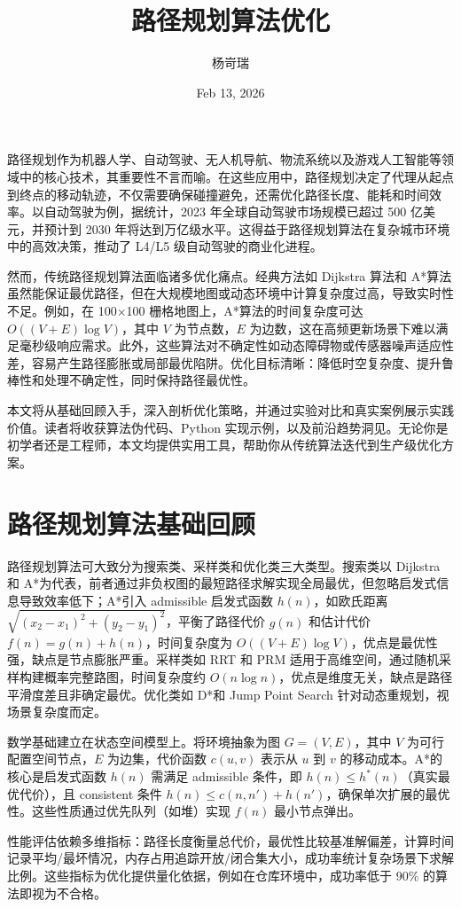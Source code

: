 \title{路径规划算法优化}
\author{杨岢瑞}
\date{Feb 13, 2026}
\maketitle
路径规划作为机器人学、自动驾驶、无人机导航、物流系统以及游戏人工智能等领域中的核心技术，其重要性不言而喻。在这些应用中，路径规划决定了代理从起点到终点的移动轨迹，不仅需要确保碰撞避免，还需优化路径长度、能耗和时间效率。以自动驾驶为例，据统计，2023 年全球自动驾驶市场规模已超过 500 亿美元，并预计到 2030 年将达到万亿级水平。这得益于路径规划算法在复杂城市环境中的高效决策，推动了 L4/L5 级自动驾驶的商业化进程。\par
然而，传统路径规划算法面临诸多优化痛点。经典方法如 Dijkstra 算法和 A*算法虽然能保证最优路径，但在大规模地图或动态环境中计算复杂度过高，导致实时性不足。例如，在 100×100 栅格地图上，A*算法的时间复杂度可达 $O((V+E)\log V)$，其中 $V$ 为节点数，$E$ 为边数，这在高频更新场景下难以满足毫秒级响应需求。此外，这些算法对不确定性如动态障碍物或传感器噪声适应性差，容易产生路径膨胀或局部最优陷阱。优化目标清晰：降低时空复杂度、提升鲁棒性和处理不确定性，同时保持路径最优性。\par
本文将从基础回顾入手，深入剖析优化策略，并通过实验对比和真实案例展示实践价值。读者将收获算法伪代码、Python 实现示例，以及前沿趋势洞见。无论你是初学者还是工程师，本文均提供实用工具，帮助你从传统算法迭代到生产级优化方案。\par
\chapter{路径规划算法基础回顾}
路径规划算法可大致分为搜索类、采样类和优化类三大类型。搜索类以 Dijkstra 和 A*为代表，前者通过非负权图的最短路径求解实现全局最优，但忽略启发式信息导致效率低下；A*引入 admissible 启发式函数 $h(n)$，如欧氏距离 $\sqrt{(x_2 - x_1)^2 + (y_2 - y_1)^2}$，平衡了路径代价 $g(n)$ 和估计代价 $f(n) = g(n) + h(n)$，时间复杂度为 $O((V+E)\log V)$，优点是最优性强，缺点是节点膨胀严重。采样类如 RRT 和 PRM 适用于高维空间，通过随机采样构建概率完整路图，时间复杂度约 $O(n \log n)$，优点是维度无关，缺点是路径平滑度差且非确定最优。优化类如 D*和 Jump Point Search 针对动态重规划，视场景复杂度而定。\par
数学基础建立在状态空间模型上。将环境抽象为图 $G=(V,E)$，其中 $V$ 为可行配置空间节点，$E$ 为边集，代价函数 $c(u,v)$ 表示从 $u$ 到 $v$ 的移动成本。A*的核心是启发式函数 $h(n)$ 需满足 admissible 条件，即 $h(n) \leq h^{*}(n)$（真实最优代价），且 consistent 条件 $h(n) \leq c(n, n') + h(n')$，确保单次扩展的最优性。这些性质通过优先队列（如堆）实现 $f(n)$ 最小节点弹出。\par
性能评估依赖多维指标：路径长度衡量总代价，最优性比较基准解偏差，计算时间记录平均/最坏情况，内存占用追踪开放/闭合集大小，成功率统计复杂场景下求解比例。这些指标为优化提供量化依据，例如在仓库环境中，成功率低于 90\%{} 的算法即视为不合格。\par
